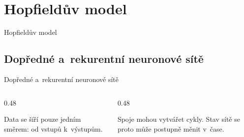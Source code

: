 \documentclass[11pt,professionalfont,aspectratio=43]{beamer}
\begin{document}
\section{Hopfieldův model}

\begin{titleframeenv}{Hopfieldův model}
\end{titleframeenv}

\subsection{Dopředné a~rekurentní neuronové sítě}

\begin{frame}{Dopředné a~rekurentní neuronové sítě}

    \begin{columns}[T]
        \begin{column}{0.48\textwidth}
            \begin{center}
            \end{center}
            Data se šíří pouze jedním směrem: od vstupů k~výstupům.
            \begin{center}
            \end{center}
        \end{column}

        \begin{column}{0.48\textwidth}
            \begin{center}
            \end{center}
            Spoje mohou vytvářet cykly.
            Stav sítě se proto může postupně měnit v~čase.
            \begin{center}
            \end{center}
        \end{column}
    \end{columns}




\end{frame}
\end{document}

